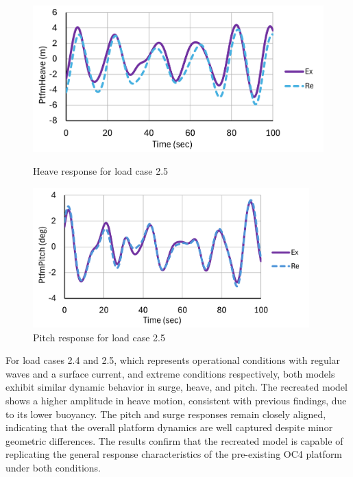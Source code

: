 \documentclass[a4paper, 11pt]{article}
\begin{document}
\begin{figure}[H]
    \begin{minipage}{0.48\textwidth}
        \centering
        \includegraphics[width=1\textwidth]{2.5_heave_mine.png}
        \caption{\small Heave response for load case 2.5}
        \label{fig:2.5_heave_mine_recreated}
    \end{minipage}
    \hfill
    \begin{minipage}{0.5\textwidth}
        \centering
        \includegraphics[width=0.95\textwidth]{2.5_pitch_mine.png}
        \caption{\small Pitch response for load case 2.5}
        \label{fig:2.5_pitch_mine_recreated}
    \end{minipage}
\end{figure}

For load cases 2.4 and 2.5, which represents operational conditions with regular waves and a surface current, and extreme conditions respectively, both models exhibit similar dynamic behavior in surge, heave, and pitch. The recreated model shows a higher amplitude in heave motion, consistent with previous findings, due to its lower buoyancy. The pitch and surge responses remain closely aligned, indicating that the overall platform dynamics are well captured despite minor geometric differences. The results confirm that the recreated model is capable of replicating the general response characteristics of the pre-existing OC4 platform under both conditions.
\end{document}
